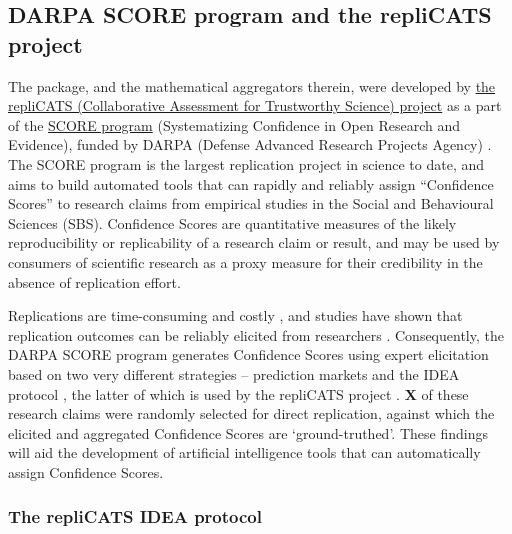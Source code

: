 \documentclass[article]{jss}
\begin{document}
\hypertarget{sec-repliCATS}{%
\subsection{DARPA SCORE program and the repliCATS
project}\label{sec-repliCATS}}

The  package, and the mathematical aggregators therein,
were developed by \href{https://replicats.research.unimelb.edu.au/}{the
repliCATS (Collaborative Assessment for Trustworthy Science) project} as
a part of the
\href{https://www.darpa.mil/program/systematizing-confidence-in-open-research-and-evidence}{SCORE
program} (Systematizing Confidence in Open Research and Evidence),
funded by DARPA (Defense Advanced Research Projects Agency)
\citep{alipourfard2021}. The SCORE program is the largest replication
project in science to date, and aims to build automated tools that can
rapidly and reliably assign ``Confidence Scores'' to research claims
from empirical studies in the Social and Behavioural Sciences (SBS).
Confidence Scores are quantitative measures of the likely
reproducibility or replicability of a research claim or result, and may
be used by consumers of scientific research as a proxy measure for their
credibility in the absence of replication effort.

Replications are time-consuming and costly \citep{Isager2020}, and
studies have shown that replication outcomes can be reliably elicited
from researchers \citep{Gordon2020}. Consequently, the DARPA SCORE
program generates Confidence Scores using expert elicitation based on
two very different strategies -- prediction markets \citep{Gordon2020}
and the IDEA protocol \citep{hemming2017}, the latter of which is used
by the repliCATS project \citep{Fraser:2021}. \textbf{X} of these
research claims were randomly selected for direct replication, against
which the elicited and aggregated Confidence Scores are
`ground-truthed'. These findings will aid the development of artificial
intelligence tools that can automatically assign Confidence Scores.

\hypertarget{sec-IDEAprotocol}{%
\subsubsection{The repliCATS IDEA protocol}\label{sec-IDEAprotocol}}
\end{document}
